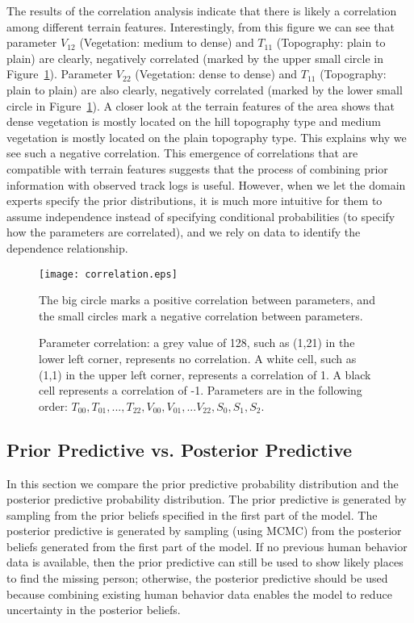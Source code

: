 The results of the correlation analysis indicate that there is likely a correlation among different terrain features. Interestingly, from this figure we can see that parameter $V_{12}$ (Vegetation: medium to dense) and $T_{11}$ (Topography: plain to plain) are clearly, negatively correlated (marked by the upper small circle in Figure~\ref{correlation}). Parameter $V_{22}$ (Vegetation: dense to dense) and $T_{11}$ (Topography: plain to plain) are also clearly, negatively correlated (marked by the lower small circle in Figure~\ref{correlation}). A closer look at the terrain features of the area shows that dense vegetation is mostly located on the hill topography type and medium vegetation is mostly located on the plain topography type. This explains why we see such a negative correlation. This emergence of correlations that are compatible with terrain features suggests that the process of combining prior information with observed track logs is useful. However, when we let the domain experts specify the prior distributions, it is much more intuitive for them to assume independence instead of specifying conditional probabilities (to specify how the parameters are correlated), and we rely on data to identify the dependence relationship.
\begin{figure}
\centering
\texttt{[image: correlation.eps]}
\caption[Parameter correlation]{Parameter correlation: a grey value of 128, such as (1,21) in the lower left corner, represents no correlation. A white cell, such as (1,1) in the upper left corner, represents a correlation of 1. A black cell represents a correlation of -1. Parameters are in the following order: $T_{00},T_{01},...,T_{22},V_{00},V_{01},...V_{22},S_{0},S_{1},S_{2}.$} The big circle marks a positive correlation between parameters, and the small circles mark a negative correlation between parameters.
\label{correlation}
\end{figure}

\subsection{Prior Predictive vs. Posterior Predictive}
\label{sec:4.4}

In this section we compare the prior predictive probability distribution and the posterior predictive probability distribution. The prior predictive is generated by sampling from the prior beliefs specified in the first part of the model. The posterior predictive is generated by sampling (using MCMC) from the posterior beliefs generated from the first part of the model. If no previous human behavior data is available, then the prior predictive can still be used to show likely places to find the missing person; otherwise, the posterior predictive should be used because combining existing human behavior data enables the model to reduce uncertainty in the posterior beliefs.

